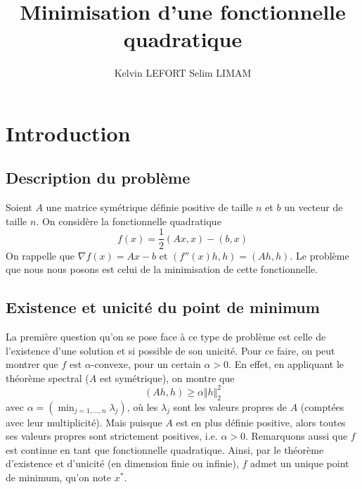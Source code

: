 \documentclass[9pt,a4paper]{article}
\title{Minimisation d'une fonctionnelle quadratique}
\author{Kelvin LEFORT Selim LIMAM}
\date
\begin{document}
\maketitle
{}
\rfoot{\thepage}
\tableofcontents %
\newpage

\section{Introduction}
\subsection{Description du problème}
Soient $A$ une matrice symétrique définie positive de taille $n$ et  $b$ un vecteur de taille $n$. On considère la fonctionnelle quadratique
$$
f(x) = \frac{1}{2}(Ax,x) - (b,x)
$$
On rappelle que $\nabla f(x) = Ax-b$ et $(f''(x)h,h) = (Ah,h)$.\newline
Le problème que nous nous posons est celui de la minimisation de cette fonctionnelle.
\subsection{Existence et unicité du point de minimum}
La première question qu'on se pose face à ce type de problème est celle de l'existence d'une solution et si possible de son unicité.\newline
Pour ce faire, on peut montrer que $f$ est $\alpha$-convexe, pour un certain $\alpha > 0$.\newline
En effet, en appliquant le théorème spectral ($A$ est symétrique), on montre que
$$
(Ah,h) \geqslant \alpha \Vert h \Vert_2^2
$$
avec $\alpha = (\min_{j=1,...,n}\lambda_j)$, où les $\lambda_j$ sont les valeurs propres de $A$ (comptées avec leur multiplicité).\newline
Mais puisque $A$ est en plus définie positive, alors toutes ses valeurs propres sont strictement positives, i.e. $\alpha > 0$.\newline
Remarquons aussi que $f$ est continue en tant que fonctionnelle quadratique.\newline
Ainsi, par le théorème d'existence et d'unicité (en dimension finie ou infinie), $f$ admet un unique point de minimum, qu'on note $x^*$.
\end{document}

